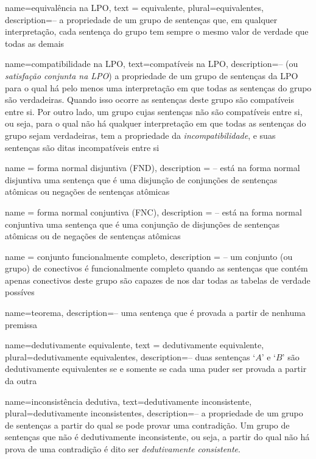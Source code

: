 {
 name=equivalência na LPO,
 text = equivalente,
 plural=equivalentes,
 description={-- a propriedade de um grupo de sentenças que, em qualquer interpretação, cada sentença do grupo tem sempre o mesmo valor de verdade que todas as demais}
}

{
 name=compatibilidade na LPO,
 text=compatíveis na LPO,
 description={-- (ou \textit{satisfação conjunta na LPO}) a propriedade de um grupo de sentenças da LPO para o qual há pelo menos uma interpretação em que todas as sentenças do grupo são verdadeiras. Quando isso ocorre as sentenças deste grupo são compatíveis entre si. Por outro lado, um grupo cujas sentenças não são compatíveis entre si, ou seja, para o qual não há qualquer interpretação em que todas as sentenças do grupo sejam verdadeiras, tem a propriedade da \textit{incompatibilidade}, e suas sentenças são ditas incompatíveis entre si}
}

{
 name = forma normal disjuntiva (FND),
 description = {-- está na forma normal disjuntiva uma sentença que é uma disjunção de conjunções de sentenças atômicas ou negações de sentenças atômicas}
}

{
 name = forma normal conjuntiva (FNC),
 description = {-- está na forma normal conjuntiva uma sentença que é uma conjunção de disjunções de sentenças atômicas ou de negações de sentenças atômicas}
}

{
 name = conjunto funcionalmente completo,
 description = {-- um conjunto (ou grupo) de conectivos é funcionalmente completo quando as sentenças que contém apenas conectivos deste grupo são capazes de nos dar todas as tabelas de verdade possíves}
}

{
 name=teorema,
 description={-- uma sentença que é provada a partir de nenhuma premissa}
}

{
 name=dedutivamente equivalente,
 text = dedutivamente equivalente,
 plural=dedutivamente equivalentes,
 description={-- duas sentenças `$A$' e `$B$' são  dedutivamente equivalentes se e somente se cada uma puder ser provada a partir da outra}
}

{
 name={inconsistência dedutiva}, 
 text={dedutivamente inconsistente},
  plural={dedutivamente inconsistentes},
 description={-- a propriedade de um grupo de sentenças a partir do qual se pode provar uma contradição. Um grupo de sentenças que não é dedutivamente inconsistente, ou seja, a partir do qual não há prova de uma contradição é dito ser \textit{dedutivamente consistente}.}
}

